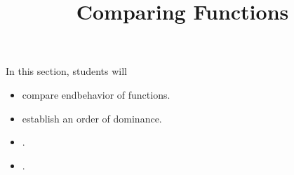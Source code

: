 \documentclass{ximera}
\title{Comparing Functions}
\begin{document}
\begin{abstract}
\end{abstract}
\maketitle

\begin{sectionOutcomes}
In this section, students will 

\begin{itemize}
\item compare endbehavior of functions.
\item establish an order of dominance.
\item .
\item .
\end{itemize}
\end{sectionOutcomes}
\end{document}
